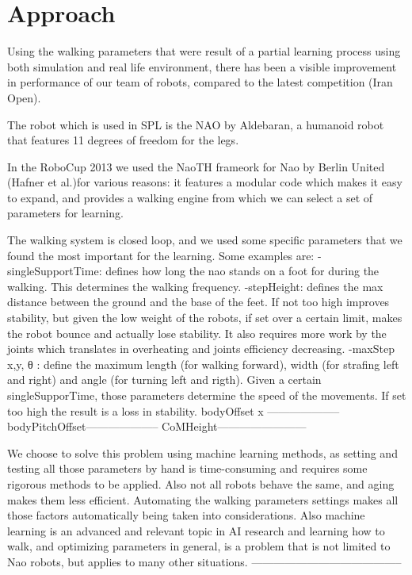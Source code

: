 \documentclass[a4paper, twocolumn]{article}
\begin{document}
\section{Approach}
Using the walking parameters that were result of a partial learning process using both simulation and real life environment, there has been a visible improvement in performance of our team of robots, compared to the latest competition (Iran Open). 
 
The robot which is used in SPL is the NAO by Aldebaran, a humanoid robot that features 11 degrees of freedom for the legs.

In the RoboCup 2013 we used the NaoTH frameork for Nao by Berlin United (Hafner et al.)for various reasons: it features a modular code which makes it easy to expand, and provides a walking engine from which we can select a set of parameters for learning. 

The walking system is closed loop, and we used some specific parameters that we found the most important for the learning.
Some examples are:
-singleSupportTime: defines how long the nao stands on a foot for during the walking. This determines the walking frequency.
-stepHeight: defines the max distance between the ground and the base of the feet. If not too high improves stability, but given the low weight of the robots, if set over a certain limit, makes the robot bounce and actually lose stability. It also requires more work by the joints which translates in overheating and joints efficiency decreasing. 
-maxStep x,y, θ : define the maximum length (for walking forward), width (for strafing left and right) and angle (for turning left and rigth). Given a certain singleSupporTime, those parameters determine the speed of the movements. If set too high the result is a loss in stability.
bodyOffset x --------------------
bodyPitchOffset--------------------
CoMHeight------------------------

We choose to solve this problem using machine learning methods, as setting and testing all those parameters by hand is time-consuming and requires some rigorous methods to be applied. Also not all robots behave the same, and aging makes them less efficient. Automating the walking parameters settings makes all those factors automatically being taken into considerations. Also machine learning is an advanced and relevant topic in AI research and learning how to walk, and optimizing parameters in general, is a problem that is not limited to Nao robots, but applies to many other situations. -----------------------------------------
\end{document}
